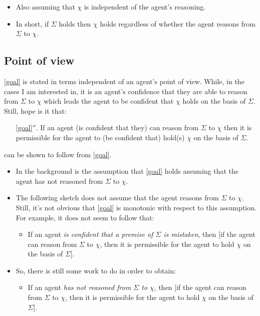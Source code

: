 \documentclass[10pt]{article}
\begin{document}
\begin{itemize}
\item Also assuming that \(\chi\) is independent of the agent's reasoning.
\item In short, if \(\Sigma\) holds then \(\chi\) holds regardless of whether the agent reasons from \(\Sigma\) to \(\chi\).
\end{itemize}


\subsection{Point of view}
\label{sec:point-view}

\ref{goal} is stated in terms independent of an agent's point of view.
While, in the cases I am interested in, it is an agent's confidence that they are able to reason from \(\Sigma\) to \(\chi\) which leads the agent to be confident that \(\chi\) holds on the basis of \(\Sigma\).
Still, hope is it that:

\begin{enumerate}
\item[\ref{goal}\(''\).] If an agent (is confident that they) can reason from \(\Sigma\) to \(\chi\) then it is permissible for the agent to (be confident that) hold(s) \(\chi\) on the basis of \(\Sigma\).
\end{enumerate}

can be shown to follow from \ref{goal}.

\begin{itemize}
\item In the background is the assumption that \ref{goal} holds assuming that the agent has not reasoned from \(\Sigma\) to \(\chi\).
\item The following sketch does not assume that the agent reasons from \(\Sigma\) to \(\chi\).
  Still, it's not obvious that \ref{goal} is monotonic with respect to this assumption.
  For example, it does not seem to follow that:
  \begin{itemize}
  \item If an agent \emph{is confident that a premise of \(\Sigma\) is mistaken}, then [if the agent can reason from \(\Sigma\) to \(\chi\), then it is permissible for the agent to hold \(\chi\) on the basis of \(\Sigma\)].
  \end{itemize}
\item So, there is still some work to do in order to obtain:
  \begin{itemize}
  \item If an agent \emph{has not reasoned from \(\Sigma\) to \(\chi\)}, then [if the agent can reason from \(\Sigma\) to \(\chi\), then it is permissible for the agent to hold \(\chi\) on the basis of \(\Sigma\)].
  \end{itemize}
\end{itemize}
\end{document}
